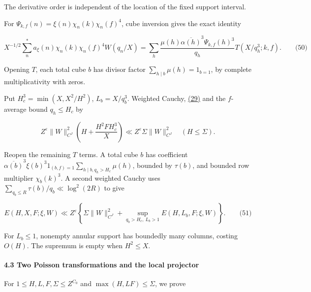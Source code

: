 The derivative order is independent of the location of the fixed support interval.

For \(\Psi_{k,f}(n)=\xi(n)\chi_n(k)\chi_n(f)^4\), cube inversion gives the exact identity

\hypertarget{cf:eq:C.6}{}

\label{cf:eq:C.6}

\[
X^{-1/2}\sum_n^{*}a_\xi(n)\chi_n(k)\chi_n(f)^4W(q_n/X)
=\sum_h\frac{\mu(h)\overline{\alpha(h)}^{3}\Psi_{k,f}(h)^3}{q_h}
T(X/q_h^3;k,f).
\qquad\text{(50)}
\]

Opening \(T\), each total cube \(b\) has divisor factor \(\sum_{h\mid b}\mu(h)=1_{b=1}\), by complete multiplicativity with zeros.

Put \(H_c^3=\min(X,X^2/H^2)\), \(L_b=X/q_b^3\). Weighted Cauchy, \protect\hyperlink{cf:eq:B.13}{(29)} and the \(f\)-average bound \(q_h\le H_c\) by

\[
Z^\varepsilon\|W\|_{C^J}^2\left(H+\frac{H^2F H_c^3}{X}\right)
\ll Z^\varepsilon\Sigma\|W\|_{C^J}^2\quad(H\le\Sigma).
\]

Reopen the remaining \(T\) terms. A total cube \(b\) has coefficient \(\overline{\alpha(b)}^3\xi(b)^3 1_{(b,f)=1}\sum_{h\mid b,q_h>H_c}\mu(h)\), bounded by \(\tau(b)\), and bounded row multiplier \(\chi_b(k)^3\). A second weighted Cauchy uses \(\sum_{q_b\le R}\tau(b)/q_b\ll\log^2(2R)\) to give

\hypertarget{cf:eq:C.7}{}

\label{cf:eq:C.7}

\[
E(H,X,F;\xi,W)
\ll Z^\varepsilon\left\{\Sigma\|W\|_{C^J}^2+
\sup_{q_b>H_c,\ L_b>1}E(H,L_b,F;\xi,W)\right\}.
\qquad\text{(51)}
\]

For \(L_b\le1\), nonempty annular support has boundedly many columns, costing \(O(H)\). The supremum is empty when \(H^2\le X\).

\hypertarget{cf:sec:C.3}{}

\label{cf:sec:C.3}

\hypertarget{two-poisson-transformations-and-the-local-projector}{%
\paragraph{4.3 Two Poisson transformations and the local projector}\label{two-poisson-transformations-and-the-local-projector}}

For \(1\le H,L,F,\Sigma\le Z^{C_0}\) and \(\max(H,LF)\le\Sigma\), we prove

\hypertarget{cf:eq:C.8}{}

